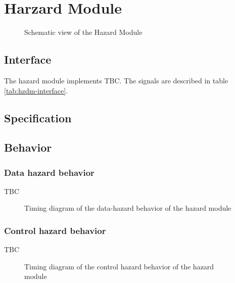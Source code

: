 \section{Harzard Module}

\begin{figure}[h!]
    \centering
    
    \caption{Schematic view of the Hazard Module}
    \label{fig:hzdm}
\end{figure}

\subsection{Interface}

\begin{content}
The hazard module implements TBC. The signals are described in table \ref{tab:hzdm-interface}. 
\end{content}



\subsection{Specification}

\subsection{Behavior}

\subsubsection{Data hazard behavior}

\begin{content}
    TBC
\end{content}

\begin{figure}[H]
    \centering
    
    \caption{Timing diagram of the data-hazard behavior of the hazard module}
    \label{fig:hzdm-behavior-data-hazard}
\end{figure}

\subsubsection{Control hazard behavior}

\begin{content}
  TBC
\end{content}

\begin{figure}[H]
    \centering
    
    \caption{Timing diagram of the control hazard behavior of the hazard module}
    \label{fig:hzdm-behavior-control-hazard}
\end{figure}

\newpage